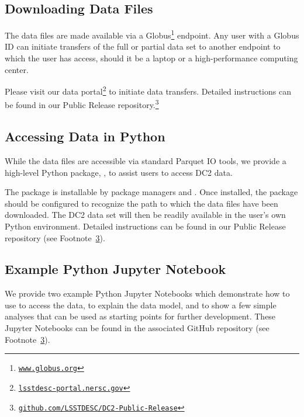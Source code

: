\documentclass[modern]{descnote}
\newcommand*{\https}[1]{\href{https://#1}{\nolinkurl{#1}}}
\begin{document}
\subsection{Downloading Data Files}
\label{sec:download}

The data files are made available via a Globus\footnote{\https{www.globus.org}} endpoint. Any user with a Globus ID can initiate transfers of the full or partial data set to another endpoint to which the user has access, should it be a laptop or a high-performance computing center. 

Please visit our data portal\footnote{\https{lsstdesc-portal.nersc.gov}} to initiate data transfers. Detailed instructions can be found in our Public Release repository.\footnote{\https{github.com/LSSTDESC/DC2-Public-Release}\label{fn:repo}}

\subsection{Accessing Data in Python}
\label{sec:gcr}

While the data files are accessible via standard Parquet IO tools, we provide a high-level Python package, , to assist users to access DC2 data. 

The  package is installable by package managers  and .
Once installed, the package should be configured to recognize the path to which the data files have been downloaded. The DC2 data set will then be readily available in the user's own Python environment. 
Detailed instructions can be found in our Public Release repository (see Footnote~\ref{fn:repo}).


\subsection{Example Python Jupyter Notebook}
\label{sec:notebooks}

We provide two example Python Jupyter Notebooks which demonstrate how to use  to access the data, to explain the data model, and to show a few simple analyses that can be used as starting points for further development. 
These Jupyter Notebooks can be found in the associated GitHub repository (see Footnote~\ref{fn:repo}).
\end{document}
